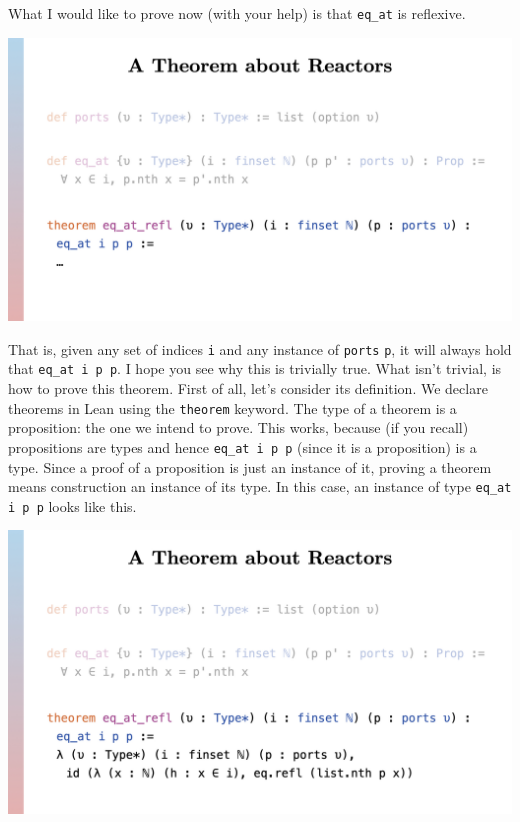 \documentclass{article}
\begin{document}
What I would like to prove now (with your help) is that \lstinline{eq_at}
is reflexive.

\begin{center}
  \includegraphics[width=\columnwidth]{Slides/Slide 11.jpeg}
\end{center}

That is, given any set of indices \lstinline{i} and any instance of
\lstinline{ports} \lstinline{p}, it will always hold that
\lstinline{eq_at i p p}. I hope you see why this is trivially true.
What isn't trivial, is how to prove this theorem. First of all, let's
consider its definition. We declare theorems in Lean using the
\lstinline{theorem} keyword. The type of a theorem is a proposition: the
one we intend to prove. This works, because (if you recall) propositions
are types and hence \lstinline{eq_at i p p} (since it is a proposition)
is a type. Since a proof of a proposition is just an instance of it,
proving a theorem means construction an instance of its type. In this
case, an instance of type \lstinline{eq_at i p p} looks like this.

\begin{center}
  \includegraphics[width=\columnwidth]{Slides/Slide 12.jpeg}
\end{center}
\end{document}
